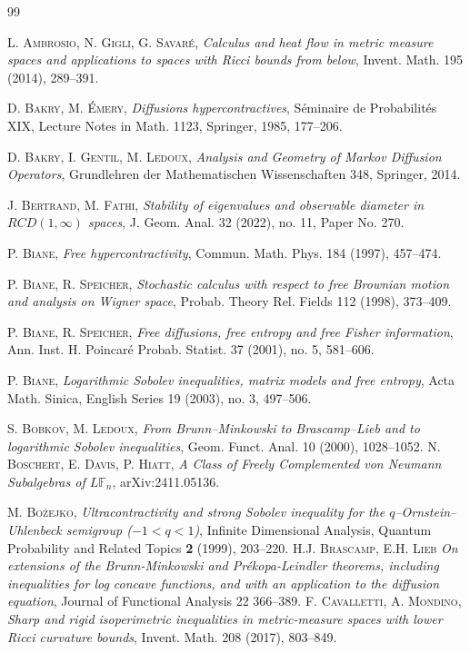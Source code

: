 \documentclass[10pt,a4paper,reqno]{amsart}
\begin{document}
\begin{thebibliography}{99}

\textsc{L. Ambrosio, N. Gigli, G. Savar\'e}, 
\textit{Calculus and heat flow in metric measure spaces and applications to spaces with Ricci bounds from below}, 
Invent. Math. 195 (2014), 289–391.



\textsc{D. Bakry, M. Émery}, 
\textit{Diffusions hypercontractives}, 
Séminaire de Probabilités XIX, Lecture Notes in Math. 1123, Springer, 1985, 177–206.

\textsc{D. Bakry, I. Gentil, M. Ledoux}, 
\textit{Analysis and Geometry of Markov Diffusion Operators}, 
Grundlehren der Mathematischen Wissenschaften 348, Springer, 2014.

\textsc{J. Bertrand, M. Fathi}, 
\textit{Stability of eigenvalues and observable diameter in $RCD(1,\infty)$ spaces}, 
J. Geom. Anal. 32 (2022), no. 11, Paper No. 270.

\textsc{P. Biane}, 
\textit{Free hypercontractivity}, 
Commun. Math. Phys. 184 (1997), 457–474.

\textsc{P. Biane, R. Speicher}, 
\textit{Stochastic calculus with respect to free Brownian motion and analysis on Wigner space}, 
Probab. Theory Rel. Fields 112 (1998), 373–409.

\textsc{P. Biane, R. Speicher}, 
\textit{Free diffusions, free entropy and free Fisher information}, 
Ann. Inst. H. Poincaré Probab. Statist. 37 (2001), no. 5, 581–606.

\textsc{P. Biane}, 
\textit{Logarithmic Sobolev inequalities, matrix models and free entropy}, 
Acta Math. Sinica, English Series 19 (2003), no. 3, 497–506.

\textsc{S. Bobkov, M. Ledoux}, 
\textit{From Brunn–Minkowski to Brascamp–Lieb and to logarithmic Sobolev inequalities}, 
Geom. Funct. Anal. 10 (2000), 1028–1052.
\textsc{N. Boschert, E. Davis, P. Hiatt},
\textit{A Class of Freely Complemented von Neumann Subalgebras of $L\mathbb{F}_n$}, 
arXiv:2411.05136.

\textsc{M. Bożejko},
\textit{Ultracontractivity and strong Sobolev inequality for the $q$--Ornstein--Uhlenbeck semigroup ($-1<q<1$)},
Infinite Dimensional Analysis, Quantum Probability and Related Topics \textbf{2} (1999), 203–220.
\textsc{H.J. Brascamp, E.H. Lieb}
\textit{On extensions of the Brunn-Minkowski and Prékopa-Leindler theorems, including inequalities for log concave functions, and with an application to the diffusion
equation}, Journal of Functional Analysis 22 366–389.
\textsc{F. Cavalletti, A. Mondino}, 
\textit{Sharp and rigid isoperimetric inequalities in metric-measure spaces with lower Ricci curvature bounds}, 
Invent. Math. 208 (2017), 803–849.



\end{thebibliography}
\end{document}
